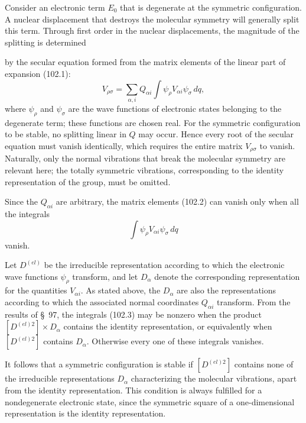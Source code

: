 Consider an electronic term $E_0$ that is degenerate at the symmetric configuration. A nuclear displacement that destroys the molecular symmetry will generally split this term. Through first order in the nuclear displacements, the magnitude of the splitting is determined

by the secular equation formed from the matrix elements of the linear part of expansion (102.1):
\begin{equation}
 V_{\rho\sigma}=\sum_{\alpha,i}Q_{\alpha i}\int\psi_\rho V_{\alpha i}\psi_\sigma\,dq,
 \tag{102.2}
\end{equation}
where $\psi_\rho$ and $\psi_\sigma$ are the wave functions of electronic states belonging to the degenerate term; these functions are chosen real. For the symmetric configuration to be stable, no splitting linear in $Q$ may occur. Hence every root of the secular equation must vanish identically, which requires the entire matrix $V_{\rho\sigma}$ to vanish. Naturally, only the normal vibrations that break the molecular symmetry are relevant here; the totally symmetric vibrations, corresponding to the identity representation of the group, must be omitted.

Since the $Q_{\alpha i}$ are arbitrary, the matrix elements (102.2) can vanish only when all the integrals
\begin{equation}
 \int\psi_\rho V_{\alpha i}\psi_\sigma\,dq
 \tag{102.3}
\end{equation}
vanish.

Let $D^{(el)}$ be the irreducible representation according to which the electronic wave functions $\psi_\rho$ transform, and let $D_\alpha$ denote the corresponding representation for the quantities $V_{\alpha i}$. As stated above, the $D_\alpha$ are also the representations according to which the associated normal coordinates $Q_{\alpha i}$ transform. From the results of \S~97, the integrals (102.3) may be nonzero when the product $[D^{(el)2}]\times D_\alpha$ contains the identity representation, or equivalently when $[D^{(el)2}]$ contains $D_\alpha$. Otherwise every one of these integrals vanishes.

It follows that a symmetric configuration is stable if $[D^{(el)2}]$ contains none of the irreducible representations $D_\alpha$ characterizing the molecular vibrations, apart from the identity representation. This condition is always fulfilled for a nondegenerate electronic state, since the symmetric square of a one-dimensional representation is the identity representation.

